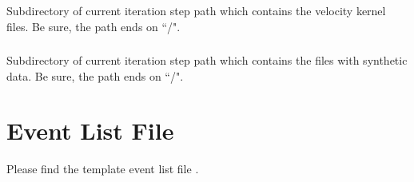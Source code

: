\subsubsection{} 
Subdirectory of current iteration step path
 which contains the 
velocity kernel files. Be sure, the path ends on ``/".
\subsubsection{} 
Subdirectory of current iteration step path
 which contains the 
files with synthetic data. Be sure, the path ends on ``/".

%
\section{Event List File} \label{files,sec:event_list}
%
Please find the template event list file .

